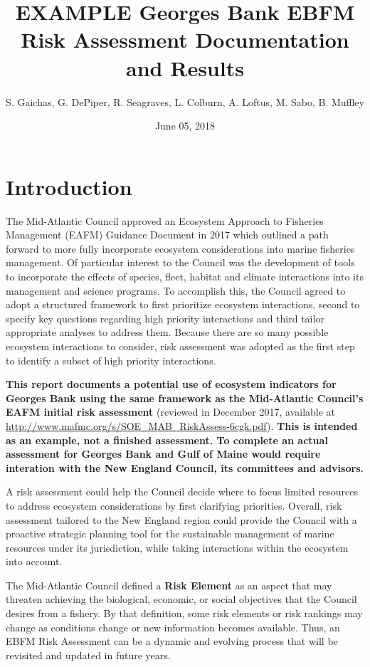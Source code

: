 \documentclass[11pt,]{article}
\title{EXAMPLE Georges Bank EBFM Risk Assessment Documentation and Results}
\author{S. Gaichas, G. DePiper, R. Seagraves, L. Colburn, A. Loftus, M. Sabo, B.
Muffley}
\date{June 05, 2018}
\begin{document}
\maketitle

\section{Introduction}\label{introduction}

The Mid-Atlantic Council approved an Ecosystem Approach to Fisheries
Management (EAFM) Guidance Document in 2017 which outlined a path
forward to more fully incorporate ecosystem considerations into marine
fisheries management. Of particular interest to the Council was the
development of tools to incorporate the effects of species, fleet,
habitat and climate interactions into its management and science
programs. To accomplish this, the Council agreed to adopt a structured
framework to first prioritize ecosystem interactions, second to specify
key questions regarding high priority interactions and third tailor
appropriate analyses to address them. Because there are so many possible
ecosystem interactions to consider, risk assessment was adopted as the
first step to identify a subset of high priority interactions.

\textbf{This report documents a potential use of ecosystem indicators
for Georges Bank using the same framework as the Mid-Atlantic Council's
EAFM initial risk assessment} (reviewed in December 2017, available at
\url{http://www.mafmc.org/s/SOE_MAB_RiskAssess-6cgk.pdf}). \textbf{This
is intended as an example, not a finished assessment. To complete an
actual assessment for Georges Bank and Gulf of Maine would require
interation with the New England Council, its committees and advisors.}

A risk assessment could help the Council decide where to focus limited
resources to address ecosystem considerations by first clarifying
priorities. Overall, risk assessment tailored to the New England region
could provide the Council with a proactive strategic planning tool for
the sustainable management of marine resources under its jurisdiction,
while taking interactions within the ecosystem into account.

The Mid-Atlantic Council defined a \textbf{Risk Element} as an aspect
that may threaten achieving the biological, economic, or social
objectives that the Council desires from a fishery. By that definition,
some risk elements or risk rankings may change as conditions change or
new information becomes available. Thus, an EBFM Risk Assessment can be
a dynamic and evolving process that will be revisited and updated in
future years.
\end{document}
